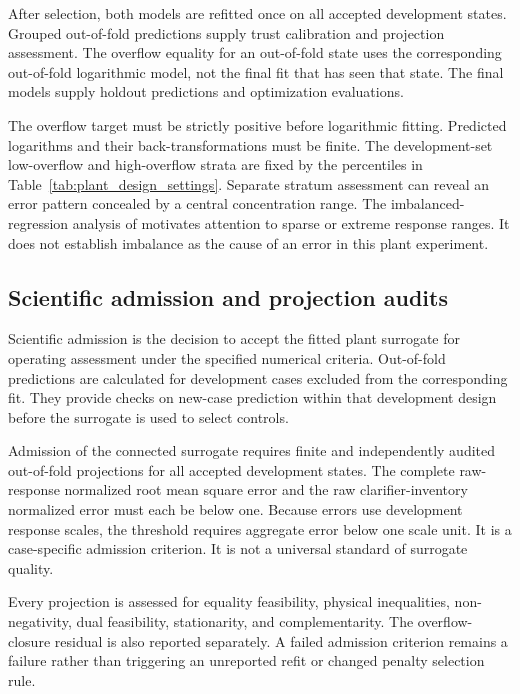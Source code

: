 After selection, both models are refitted once on all accepted development states. Grouped out-of-fold predictions supply trust calibration and projection assessment. The overflow equality for an out-of-fold state uses the corresponding out-of-fold logarithmic model, not the final fit that has seen that state. The final models supply holdout predictions and optimization evaluations.

The overflow target must be strictly positive before logarithmic fitting. Predicted logarithms and their back-transformations must be finite. The development-set low-overflow and high-overflow strata are fixed by the percentiles in Table~\ref{tab:plant_design_settings}. Separate stratum assessment can reveal an error pattern concealed by a central concentration range. The imbalanced-regression analysis of \citet{Shahbazi2026} motivates attention to sparse or extreme response ranges. It does not establish imbalance as the cause of an error in this plant experiment.

\subsection{Scientific admission and projection audits}

Scientific admission is the decision to accept the fitted plant surrogate for operating assessment under the specified numerical criteria. Out-of-fold predictions are calculated for development cases excluded from the corresponding fit. They provide checks on new-case prediction within that development design before the surrogate is used to select controls.

Admission of the connected surrogate requires finite and independently audited out-of-fold projections for all accepted development states. The complete raw-response normalized root mean square error and the raw clarifier-inventory normalized error must each be below one. Because errors use development response scales, the threshold requires aggregate error below one scale unit. It is a case-specific admission criterion. It is not a universal standard of surrogate quality.

Every projection is assessed for equality feasibility, physical inequalities, non-negativity, dual feasibility, stationarity, and complementarity. The overflow-closure residual is also reported separately. A failed admission criterion remains a failure rather than triggering an unreported refit or changed penalty selection rule.

